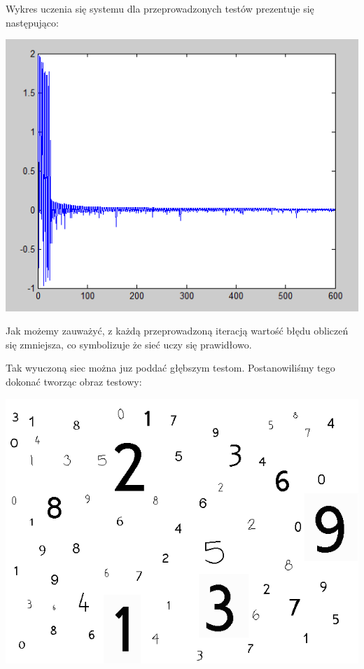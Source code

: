 \documentclass[11pt,a4paper]{article}
\begin{document}
Wykres uczenia się systemu dla przeprowadzonych testów prezentuje się następująco:
\begin{center}
\includegraphics[scale=0.5]{wykres}
\end{center}

Jak możemy zauważyć, z każdą przeprowadzoną iteracją wartość błędu obliczeń się zmniejsza, 
co symbolizuje że sieć uczy się prawidłowo.

Tak wyuczoną siec można juz poddać głębszym testom. Postanowiliśmy tego dokonać tworząc obraz 
testowy:
\begin{center}
\includegraphics[scale=0.35]{test1}
\end{center}
\end{document}

